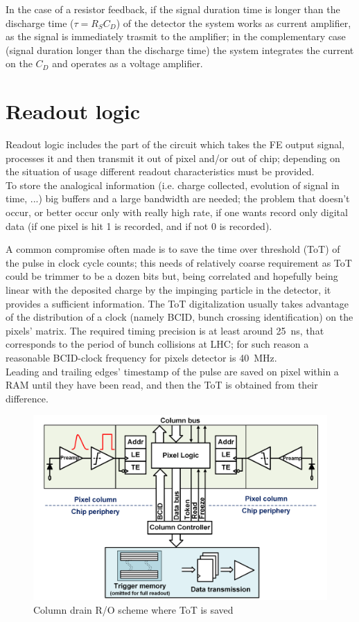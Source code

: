       In the case of a resistor feedback, if the signal duration time is longer than the discharge time ($\tau=R_S C_D$) of the detector the system works as current amplifier, as the signal is immediately trasmit to the amplifier; in the complementary case (signal duration longer than the discharge time) the system integrates the current on the $C_D$ and operates as a voltage amplifier.
      
\section{Readout logic}
   Readout logic includes the part of the circuit which takes the FE output signal, processes it and then transmit it out of pixel and/or out of chip; depending on the situation of usage different readout characteristics must be provided. \\
   To store the analogical information (i.e. charge collected, evolution of signal in time, ...) big buffers and a large bandwidth are needed; the problem that doesn't occur, or better occur only with really high rate, if one wants record only digital data (if one pixel is hit 1 is recorded, and if not 0 is recorded). 

   A common compromise often made is to save the time over threshold (ToT) of the pulse in clock cycle counts; this needs of relatively coarse requirement as ToT could be trimmer to be a dozen bits but, being correlated and hopefully being linear with the deposited charge by the impinging particle in the detector, it provides a sufficient information.
   The ToT digitalization usually takes advantage of the distribution of a clock (namely BCID,  bunch crossing identification) on the pixels' matrix. The required timing precision is at least around \SI{25}{ns}, that corresponds to the period of bunch collisions at LHC; for such reason a reasonable BCID-clock frequency for pixels detector is \SI{40}{MHz}.\\
   Leading and trailing edges' timestamp of the pulse are saved on pixel within a RAM until they have been read,  and then the ToT is obtained from their difference.
   \begin{figure}[h!]
      \centering
      \includegraphics[width=.7\linewidth]{figures/Pixel_detectors/column_drain_RO.png}
      \caption{Column drain R/O scheme where ToT is saved}
      \label{fig:column_drain_RO-like}
   \end{figure}

